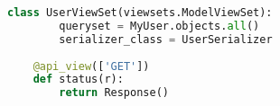 \begin{lstlisting}[language=Python,caption={Controllers for django endpoints},breaklines=true,label={lst:djangoViews}]
    class UserViewSet(viewsets.ModelViewSet):
        queryset = MyUser.objects.all()
        serializer_class = UserSerializer
    
    @api_view(['GET'])
    def status(r):
        return Response()    
\end{lstlisting}

